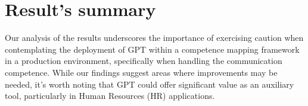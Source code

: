 \section{Result's summary}
Our analysis of the results underscores the importance of exercising caution when contemplating the deployment of GPT within a competence mapping framework in a production environment, specifically when handling the communication competence. While our findings suggest areas where improvements may be needed, it's worth noting that GPT could offer significant value as an auxiliary tool, particularly in Human Resources (HR) applications.
